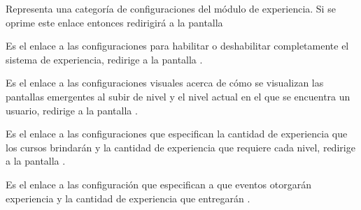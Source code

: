    \begin{description}[font=\color{primary}]

            Representa una categoría de configuraciones del módulo de experiencia. Si se oprime
            este enlace entonces redirigirá a la pantalla \hfill

        \begin{description}[font={\labelitemi\ \color{black}}]

            Es el enlace a las configuraciones para habilitar o deshabilitar completamente
            el sistema de experiencia, redirige a la pantalla .

            Es el enlace a las configuraciones visuales acerca de cómo se visualizan las
            pantallas emergentes al subir de nivel y el nivel actual en el que se encuentra
            un usuario, redirige a la pantalla .

            Es el enlace a las configuraciones que especifican la cantidad de experiencia que
            los cursos brindarán y la cantidad de experiencia que requiere cada nivel, redirige
            a la pantalla .

            Es el enlace a las configuración que especifican a que eventos otorgarán experiencia
            y la cantidad de experiencia que entregarán .
        \end{description}

    \end{description}

\clearpage
